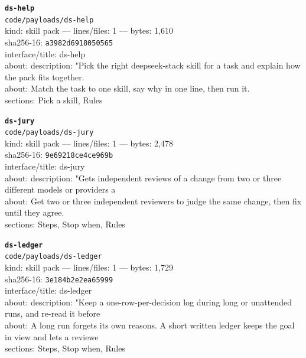 \noindent\textbf{\texttt{ds-help}}\\
\texttt{code/payloads/ds-help}\\
kind: skill pack --- lines/files: 1 --- bytes: 1,610\\
sha256-16: \texttt{a3982d6918050565}\\
interface/title: ds-help\\
about: description: "Pick the right deepseek-stack skill for a task and explain how the pack fits together.\\
about: Match the task to one skill, say why in one line, then run it.\\
sections: Pick a skill, Rules\\
\vspace*{6.0pt}
\newpage

\noindent\textbf{\texttt{ds-jury}}\\
\texttt{code/payloads/ds-jury}\\
kind: skill pack --- lines/files: 1 --- bytes: 2,478\\
sha256-16: \texttt{9e69218ce4ce969b}\\
interface/title: ds-jury\\
about: description: "Gets independent reviews of a change from two or three different models or providers a\\
about: Get two or three independent reviewers to judge the same change, then fix until they agree.\\
sections: Steps, Stop when, Rules\\
\vspace*{6.0pt}

\noindent\textbf{\texttt{ds-ledger}}\\
\texttt{code/payloads/ds-ledger}\\
kind: skill pack --- lines/files: 1 --- bytes: 1,729\\
sha256-16: \texttt{3e184b2e2ea65999}\\
interface/title: ds-ledger\\
about: description: "Keep a one-row-per-decision log during long or unattended runs, and re-read it before \\
about: A long run forgets its own reasons. A short written ledger keeps the goal in view and lets a reviewe\\
sections: Steps, Stop when, Rules\\
\vspace*{6.0pt}

